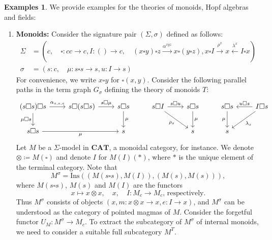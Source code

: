 \documentclass[11pt]{article}
\theoremstyle{plain}
\theoremstyle{definition}
\newtheorem{examples}[theorem]{Examples}
\numberwithin{equation}{section}
\newcommand{\CAT}{\mathbf{CAT}}
\newcommand{\Ins}{\mathrm{Ins}}
\begin{document}
\begin{examples}\label{exs:theories}
   We provide examples for the theories of monoids, Hopf algebras and fields:
   \begin{enumerate}
       \item \textbf{Monoids:} Consider the signature pair $(\Sigma, \sigma)$ defined as follows:
       \begin{align*}
       \Sigma   
       &= (c,\quad \square\colon cc\to c, I\colon ()\to c,\quad (x\square y)\square z\xrightarrow{\alpha^{xyz}} x\square (y\square z), x\square I\xrightarrow{\rho^x} x\xleftarrow{\lambda^x} I\square x)\\
       \sigma
       &= (s\colon c,\quad \mu\colon s\square s\to s, u\colon I\to s)
   \end{align*}
   For convenience, we write $x\square y$ for $\square(x,y)$. Consider the following parallel paths in the term graph $G_{\sigma}$ defining the theory of monoids $T$:
   $$
   \begin{tikzcd}[column sep=0.8 cm]
   (s \square s) \square s \arrow[d, "\mu \square s"'] \arrow[r, "\alpha_{s,s,s}"] & s \square (s \square s) \arrow[r, "s \square \mu"] & s \square s \arrow[d, "\mu"] & s \square I \arrow[r, "s \square u"] \arrow[rd, "\rho_s"'] & s \square s \arrow[d, "\mu"] & s \square s \arrow[d, "\mu"'] & I \square s \arrow[l, "u \square s"'] \arrow[ld, "\lambda_s"] \\
   s \square s \arrow[rr, "\mu"'] & & s & & s & s & 
   \end{tikzcd}
   $$
   Let $M$ be a $\Sigma$-model in $\CAT$, a monoidal category, for instance. We denote $\otimes\coloneqq M(\square)$ and denote $I$ for $M(I)(*)$, where $*$ is the unique element of the terminal category. Note that 
   $$
   M^\sigma = \Ins((M(s\square s),M(I)), (M(s),M(s))),
   $$
   where $M(s\square s)$, $M(s)$ and $M(I)$ are the functors 
   $$
   x\mapsto x\otimes x, \quad x, \quad I\colon M_c\to M_c\text{, respectively.} 
   $$
   Thus $M^\sigma$ consists of objects $(x,m\colon x\otimes x\to x, e\colon I\to x)$, and $M^\sigma$ can be understood as the category of pointed magmas of $M$. Consider the forgetful functor $U_M\colon M^\sigma\to M_c$. To extract the subcategory of $M^\sigma$ of internal monoids, we need to consider a suitable full subcategory $M^T$.


\end{enumerate}
\end{examples}
\end{document}
